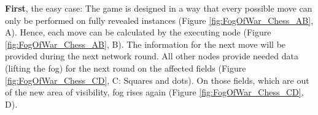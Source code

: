 \noindent \textbf{First}, the easy case:
The game is designed in a way that every possible move can only be performed on fully revealed instances (Figure \ref{fig:FogOfWar_Chess_AB}, A).
Hence, each move can be calculated by the executing node (Figure \ref{fig:FogOfWar_Chess_AB}, B).
The information for the next move will be provided during the next network round.
All other nodes provide needed data (lifting the fog) for the next round on the affected fields (Figure \ref{fig:FogOfWar_Chess_CD}, C: Squares and dots).
On those fields, which are out of the new area of visibility, fog rises again (Figure \ref{fig:FogOfWar_Chess_CD}, D).
\begin{figure}
\end{figure}

